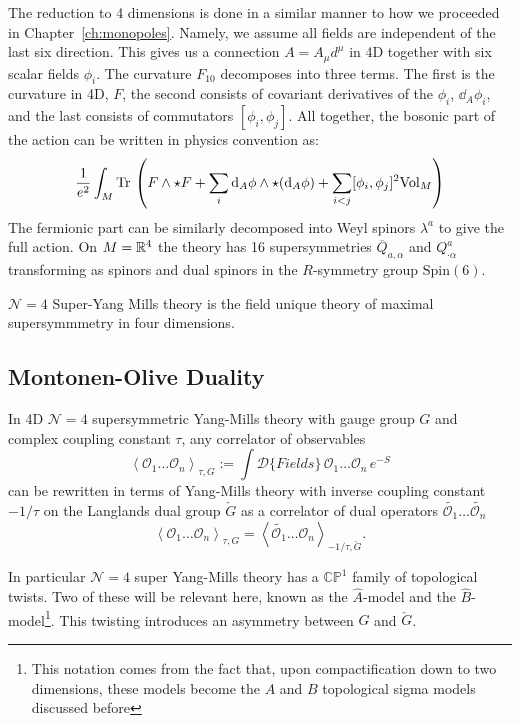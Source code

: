 The reduction to 4 dimensions is done in a similar manner to how we proceeded in Chapter~\ref{ch:monopoles}. Namely, we assume all fields are independent of the last six direction. This gives us a connection $A =A_\mu d^\mu$ in 4D together with six scalar fields $\phi_i$. The curvature $F_{10}$ decomposes into three terms. The first is the curvature in 4D, $F$, the second consists of covariant derivatives of the $\phi_i$, $\dd_A \phi_i$, and the last consists of commutators $[\phi_i, \phi_j]$. All together, the bosonic part of the action can be written in physics convention as:
\begin{equation}
	\frac{1}{e^2} \int_M \mathrm{Tr}\,\left( F \wedge \star F + \sum_i \mathrm{d}_A \phi \wedge \star (\mathrm{d}_A \phi) +  \sum_{i < j} [\phi_i, \phi_j]^2 \mathrm{Vol}_M \right)
\end{equation}
The fermionic part can be similarly decomposed into Weyl spinors $\lambda^a$ to give the full action.
On $M=\mathbb{R}^4$ the theory has 16 supersymmetries $\overline Q_{a, \alpha}$ and $Q^a_{\cdot \alpha}$ transforming as spinors and dual spinors in the $R$-symmetry group $\mathrm{Spin}(6)$.

\begin{phys}
	$\mathcal N=4$ Super-Yang Mills theory is the field unique theory of maximal supersymmmetry in four dimensions.
\end{phys}


\subsection{Montonen-Olive Duality} %
\label{sub:montonen_olive_duality}

	\begin{concept}
		In 4D $\mathcal N = 4$ supersymmetric Yang-Mills theory with gauge group $G$ and complex coupling constant $\tau$, any correlator of observables
		\[
			\left< \mathcal O_1 \dots \mathcal O_n \right>_{\tau, G} := \int \mathcal{D}\{ Fields \}\, \mathcal O_1 \dots \mathcal O_n \, e^{-S}
		\]
		can be rewritten in terms of Yang-Mills theory with inverse coupling constant $-1/\tau$ on the Langlands dual group $\check G$ as a correlator of dual operators $\tilde {\mathcal O_1} \dots \tilde {\mathcal O_n}$
		\[
			\left< \mathcal O_1 \dots \mathcal O_n \right>_{\tau, G} = \left< \tilde{\mathcal O_1} \dots \mathcal O_n \right>_{-1/\tau, \check G}.
		\]
	\end{concept}
	In particular $\mathcal N = 4$ super Yang-Mills theory has a $\mathbb{CP}^1$ family of topological twists. Two of these will be relevant here, known as the $\hat A$-model and the $\hat B$-model\footnote{This notation comes from the fact that, upon compactification down to two dimensions, these models become the $A$ and $B$ topological sigma models discussed before}. This twisting introduces an asymmetry between $G$ and $\check G$.  

